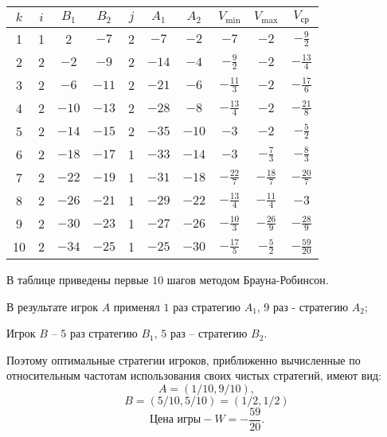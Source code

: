\documentclass[11pt]{article}
\begin{document}
\begin{table}[h]
\centering
\begin{tabular}{|c|c|c|c|c|c|c|c|c|c|}
\hline
$k$ & $i$ & $B_1$ & $B_2$ & $j$ & $A_1$ & $A_2$ & $V_{\text{min}}$ & $V_{\text{max}}$ & $V_{\text{ср}}$ \\
\hline
1 & 1 & 2 & $-7$ & 2 & $-7$ & $-2$ & $-7$ & $-2$ & $-\frac{9}{2}$ \\
\hline
2 & 2 & $-2$ & $-9$ & 2 & $-14$ & $-4$ & $-\frac{9}{2}$ & $-2$ & $-\frac{13}{4}$ \\
\hline
3 & 2 & $-6$ & $-11$ & 2 & $-21$ & $-6$ & $-\frac{11}{3}$ & $-2$ & $-\frac{17}{6}$ \\
\hline
4 & 2 & $-10$ & $-13$ & 2 & $-28$ & $-8$ & $-\frac{13}{4}$ & $-2$ & $-\frac{21}{8}$ \\
\hline
5 & 2 & $-14$ & $-15$ & 2 & $-35$ & $-10$ & $-3$ & $-2$ & $-\frac{5}{2}$ \\
\hline
6 & 2 & $-18$ & $-17$ & 1 & $-33$ & $-14$ & $-3$ & $-\frac{7}{3}$ & $-\frac{8}{3}$ \\
\hline
7 & 2 & $-22$ & $-19$ & 1 & $-31$ & $-18$ & $-\frac{22}{7}$ & $-\frac{18}{7}$ & $-\frac{20}{7}$ \\
\hline
8 & 2 & $-26$ & $-21$ & 1 & $-29$ & $-22$ & $-\frac{13}{4}$ & $-\frac{11}{4}$ & $-3$ \\
\hline
9 & 2 & $-30$ & $-23$ & 1 & $-27$ & $-26$ & $-\frac{10}{3}$ & $-\frac{26}{9}$ & $-\frac{28}{9}$ \\
\hline
10 & 2 & $-34$ & $-25$ & 1 & $-25$ & $-30$ & $-\frac{17}{5}$ & $-\frac{5}{2}$ & $-\frac{59}{20}$ \\
\hline
\end{tabular}
\end{table}

В таблице приведены первые $10$ шагов методом Брауна-Робинсон. 

В результате игрок $A$ применял $1$ раз стратегию $A_1$, 9 раз - стратегию $A_2$;

Игрок $B$ – $5$ раз стратегию $B_1$, $5$ раз – стратегию $B_2$. 

Поэтому оптимальные стратегии игроков, приближенно вычисленные по относительным частотам использования своих чистых стратегий, имеют вид:
$$A = (1/10, 9/10),$$
$$B = (5/10, 5/10) = (1/2, 1/2)$$
$$\text{Цена игры} - W = -\dfrac{59}{20}.$$
\end{document}
